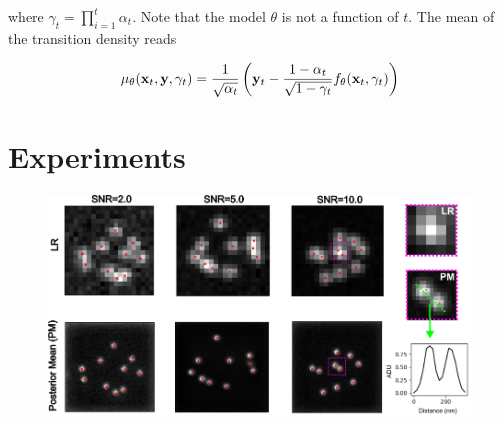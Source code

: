 \documentclass{article}
\begin{document}
where $\gamma_{t}=\prod_{i=1}^{t}\alpha_{t}$. Note that the model $\theta$ is not a function of $t$. The mean of the transition density reads

\begin{equation}
\mu_{\theta}(\bold{x}_{t},\bold{y},\gamma_{t}) = \frac{1}{\sqrt{\alpha_{t}}}\left(\bold{y}_t-\frac{1-\alpha_{t}}{\sqrt{1-\gamma_{t}}}f_{\theta}(\bold{x}_{t},\gamma_{t})\right)
\end{equation}


\section{Experiments}


\begin{figure}
\includegraphics[scale=0.6]{Samples.png}
\end{figure}
\end{document}
